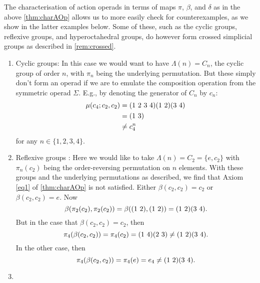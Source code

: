 \begin{example}\label{Ex:counterex}
The characterisation of action operads in terms of maps $\pi$, $\beta$, and $\delta$ as in the above \cref{thm:charAOp} allows us to more easily check for counterexamples, as we show in the latter examples below. Some of these, such as the cyclic groups, reflexive groups, and hyperoctahedral groups, do however form crossed simplicial groups as described in \cref{rem:crossed}.
\begin{enumerate}
\item Cyclic groups: In this case we would want to have $\Lambda(n) = C_n$, the cyclic group of order $n$, with $\pi_n$ being the underlying permutation. But these simply don't form an operad if we are to emulate the composition operation from the symmetric operad $\Sigma$. E.g., by denoting the generator of $C_n$ by $c_n$:
  \begin{align*}
    \mu(c_4 ; c_2, c_2) &= (1 \,\, 2 \,\, 3 \,\, 4)( 1 \, \, 2 )( 3 \, \, 4 ) \\
    &= ( 1 \, \, 3 ) \\
    &\neq c_4^n
  \end{align*}
for any $n \in \{1,2,3,4\}$.
\item Reflexive groups \cite{Kra87}: Here we would like to take $\Lambda(n) = C_2 = \{e, c_2\}$ with $\pi_n(c_2)$ being the order-reversing permutation on $n$ elements. With these groups and the underlying permutations as described, we find that Axiom \ref{eq1} of \cref{thm:charAOp} is not satisfied. Either $\beta(c_2,c_2) = c_2$ or $\beta(c_2,c_2) = e$. Now
  \[
    \beta(\pi_2(c_2),\pi_2(c_2)) = \beta(( 1 \, \, 2 ),( 1 \, \, 2 )) = ( 1 \, \, 2 )( 3 \, \, 4 ).
  \]
But in the case that $\beta(c_2,c_2) = c_2$, then
  \[
    \pi_4(\beta(c_2,c_2)) = \pi_4(c_2) = ( 1 \, \, 4 )( 2 \, \, 3 ) \neq ( 1 \, \, 2 )( 3 \, \, 4 ).
  \]
In the other case, then
  \[
    \pi_4(\beta(c_2,c_2)) = \pi_4(e) = e_4 \neq ( 1 \, \, 2 )( 3 \, \, 4 ).
  \]
\item


\end{enumerate}
\end{example}
